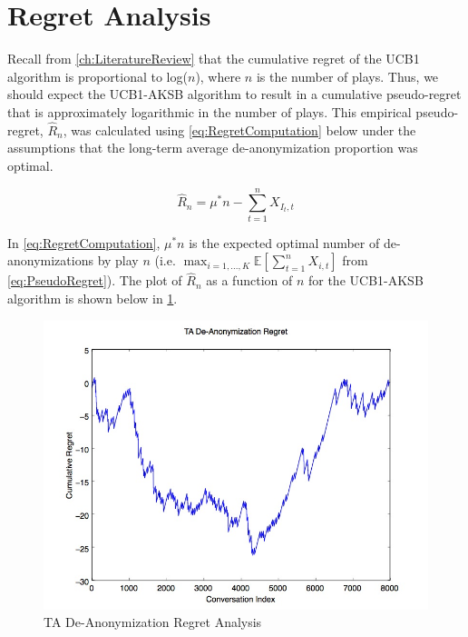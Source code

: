 \section{Regret Analysis}

Recall from \ref{ch:LiteratureReview} that the cumulative regret of the UCB1 algorithm is proportional to log($n$), where $n$ is the number of plays. Thus, we should expect the UCB1-AKSB algorithm to result in a cumulative pseudo-regret that is approximately logarithmic in the number of plays. This empirical pseudo-regret, $\hat{R}_n$, was calculated using \ref{eq:RegretComputation} below under the assumptions that the long-term average de-anonymization proportion was optimal.

\begin{equation}
\label{eq:RegretComputation}
\hat{R}_n = \mu^{*}n - \sum_{t=1}^{n}{X_{I_t, t}}
\end{equation}

In \ref{eq:RegretComputation}, $\mu^{*}n$ is the expected optimal number of de-anonymizations by play $n$ (i.e. $\max_{i=1,...,K}{\mathbb{E}\left[\sum_{t=1}^{n}{X_{i, t}}\right]}$ from \ref{eq:PseudoRegret}). The plot of $\hat{R}_n$ as a function of $n$ for the UCB1-AKSB algorithm is shown below in \ref{fig:TADe-AnonymizationRegret}.

\begin{figure}[htb]
\centering
\includegraphics[trim= 0mm 0mm 0mm 0mm, clip, scale=0.5]{./Figures/TADe-AnonymizationRegret.jpg}
\caption{TA De-Anonymization Regret Analysis}
\label{fig:TADe-AnonymizationRegret}
\end{figure}

